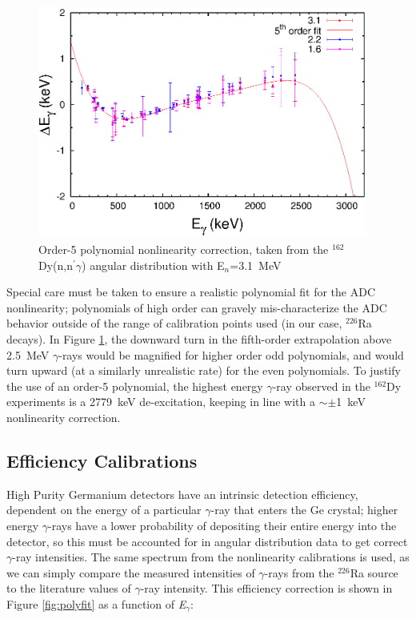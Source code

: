 \begin{figure}[ht]
\begin{center}
\includegraphics[width=0.97\textwidth]{310_dsnonlin_color.eps}
\caption{Order-5 polynomial nonlinearity correction, taken from the $^{162}$Dy(n,n$^{\prime}\gamma$) angular distribution with E$_n$=3.1~MeV}
\label{fig:dsnonlin}
\end{center}
\end{figure}
Special care must be taken to ensure a realistic polynomial fit for the ADC nonlinearity; polynomials of high order can gravely mis-characterize the ADC behavior outside of the range of calibration points used (in our case, $^{226}$Ra decays). In Figure \ref{fig:dsnonlin}, the downward turn in the fifth-order extrapolation above 2.5~MeV $\gamma$-rays would be magnified for higher order odd polynomials, and would turn upward (at a similarly unrealistic rate) for the even polynomials. To justify the use of an order-5 polynomial, the highest energy $\gamma$-ray observed in the $^{162}$Dy experiments is a 2779~keV de-excitation, keeping in line with a $\sim\pm$1~keV nonlinearity correction.
\subsection{Efficiency Calibrations}\label{sec:efficiency_calibration}
High Purity Germanium detectors have an intrinsic detection efficiency, dependent on the energy of a particular $\gamma$-ray that enters the Ge crystal; higher energy $\gamma$-rays have a lower probability of depositing their entire energy into the detector, so this must be accounted for in angular distribution data to get correct $\gamma$-ray intensities. The same spectrum from the nonlinearity calibrations is used, as we can simply compare the measured intensities of $\gamma$-rays from the $^{226}$Ra source to the literature values of $\gamma$-ray intensity. This efficiency correction is shown in Figure \ref{fig:polyfit} as a function of \textit{E$_\gamma$}:

